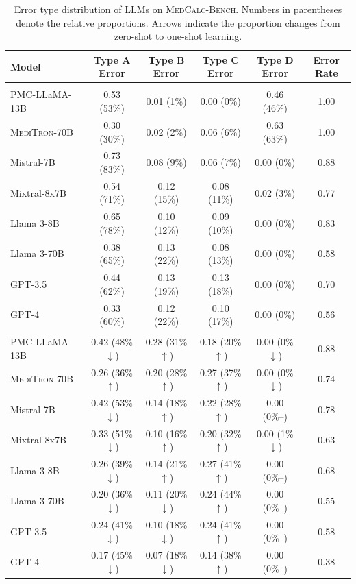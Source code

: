 \begin{table}[h!] \small
    \centering
    \caption{Error type distribution of LLMs on \textsc{MedCalc-Bench}. Numbers in parentheses denote the relative proportions. Arrows indicate the proportion changes from zero-shot to one-shot learning.}
    \begin{tabular}{lccccc}
        \toprule
        \bf Model & \textbf{Type A Error} & \textbf{Type B Error} & \textbf{Type C Error} & \textbf{Type D Error} & \bf \textbf{Error Rate} \\
        \midrule
        \rowcolor[RGB]{234, 238, 234}
        \multicolumn{6}{l}{\it Zero-shot CoT Prompting} \\
PMC-LLaMA-13B & 0.53 (53\%) & 0.01 (1\%) & 0.00 (0\%) & 0.46 (46\%) & 1.00 \\
\textsc{MediTron}-70B & 0.30 (30\%) & 0.02 (2\%) & 0.06 (6\%) & 0.63 (63\%) & 1.00 \\
Mistral-7B & 0.73 (83\%) & 0.08 (9\%) & 0.06 (7\%) & 0.00 (0\%) & 0.88 \\
Mixtral-8x7B & 0.54 (71\%) & 0.12 (15\%) & 0.08 (11\%) & 0.02 (3\%) & 0.77 \\
Llama 3-8B & 0.65 (78\%) & 0.10 (12\%) & 0.09 (10\%) & 0.00 (0\%) & 0.83 \\
Llama 3-70B & 0.38 (65\%) & 0.13 (22\%) & 0.08 (13\%) & 0.00 (0\%) & 0.58 \\
GPT-3.5 & 0.44 (62\%) & 0.13 (19\%) & 0.13 (18\%) & 0.00 (0\%) & 0.70 \\
GPT-4 & 0.33 (60\%) & 0.12 (22\%) & 0.10 (17\%) & 0.00 (0\%) & 0.56 \\
        \midrule
        \rowcolor[RGB]{234, 238, 234}
        \multicolumn{6}{l}{\it One-shot CoT Prompting} \\
PMC-LLaMA-13B & 0.42 (48\%\(\downarrow\)) & 0.28 (31\%\(\uparrow\)) & 0.18 (20\%\(\uparrow\)) & 0.00 (0\%\(\downarrow\)) & 0.88 \\
\textsc{MediTron}-70B & 0.26 (36\%\(\uparrow\)) & 0.20 (28\%\(\uparrow\)) & 0.27 (37\%\(\uparrow\)) & 0.00 (0\%\(\downarrow\)) & 0.74 \\
Mistral-7B & 0.42 (53\%\(\downarrow\)) & 0.14 (18\%\(\uparrow\)) & 0.22 (28\%\(\uparrow\)) & 0.00 (0\%--) & 0.78 \\
Mixtral-8x7B & 0.33 (51\%\(\downarrow\)) & 0.10 (16\%\(\uparrow\)) & 0.20 (32\%\(\uparrow\)) & 0.00 (1\%\(\downarrow\)) & 0.63 \\
Llama 3-8B & 0.26 (39\%\(\downarrow\)) & 0.14 (21\%\(\uparrow\)) & 0.27 (41\%\(\uparrow\)) & 0.00 (0\%--) & 0.68 \\
Llama 3-70B & 0.20 (36\%\(\downarrow\)) & 0.11 (20\%\(\downarrow\)) & 0.24 (44\%\(\uparrow\)) & 0.00 (0\%--) & 0.55 \\
GPT-3.5 & 0.24 (41\%\(\downarrow\)) & 0.10 (18\%\(\downarrow\)) & 0.24 (41\%\(\uparrow\)) & 0.00 (0\%--) & 0.58 \\
GPT-4 & 0.17 (45\%\(\downarrow\)) & 0.07 (18\%\(\downarrow\)) & 0.14 (38\%\(\uparrow\)) & 0.00 (0\%--) & 0.38 \\
        \bottomrule
    \end{tabular}
    \label{tab:error_analysis_results}
\end{table}
